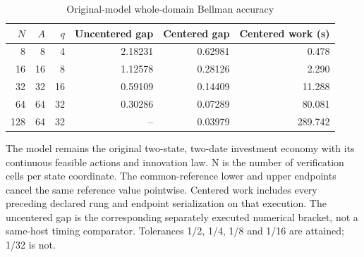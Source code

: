 \begin{table}[htbp]
\centering
\caption{Original-model whole-domain Bellman accuracy}\label{tab:bellman61}
{\small\setlength{\tabcolsep}{3pt}
\begin{tabular}{rrrrrr}
\hline
$N$ & $A$ & $q$ & Uncentered gap & Centered gap & Centered work (s) \\
\hline
8 & 8 & 4 & 2.18231 & 0.62981 & 0.478 \\
16 & 16 & 8 & 1.12578 & 0.28126 & 2.290 \\
32 & 32 & 16 & 0.59109 & 0.14409 & 11.288 \\
64 & 64 & 32 & 0.30286 & 0.07289 & 80.081 \\
128 & 64 & 32 & -- & 0.03979 & 289.742 \\
\hline\end{tabular}}
\par\smallskip
{\footnotesize The model remains the original two-state, two-date investment economy with its continuous feasible actions and innovation law. N is the number of verification cells per state coordinate. The common-reference lower and upper endpoints cancel the same reference value pointwise. Centered work includes every preceding declared rung and endpoint serialization on that execution. The uncentered gap is the corresponding separately executed numerical bracket, not a same-host timing comparator. Tolerances 1/2, 1/4, 1/8 and 1/16 are attained; 1/32 is not.}
\end{table}
